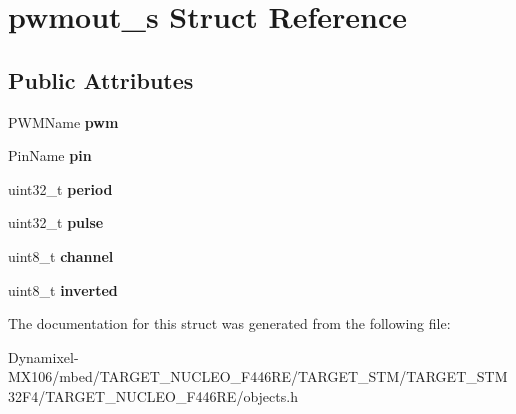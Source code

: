 \hypertarget{structpwmout__s}{}\section{pwmout\+\_\+s Struct Reference}
\label{structpwmout__s}
\subsection*{Public Attributes}
\begin{DoxyCompactItemize}
\item 
P\+W\+M\+Name {\bfseries pwm}\hypertarget{structpwmout__s_a0f9fcf14696c537528ba36b7f7c87983}{}\label{structpwmout__s_a0f9fcf14696c537528ba36b7f7c87983}

\item 
Pin\+Name {\bfseries pin}\hypertarget{structpwmout__s_a643a7952e0db81d57ce31cfd7e1867b3}{}\label{structpwmout__s_a643a7952e0db81d57ce31cfd7e1867b3}

\item 
uint32\+\_\+t {\bfseries period}\hypertarget{structpwmout__s_ab2160f7fe7387aa18b4fedd8ab1967ff}{}\label{structpwmout__s_ab2160f7fe7387aa18b4fedd8ab1967ff}

\item 
uint32\+\_\+t {\bfseries pulse}\hypertarget{structpwmout__s_ab2ad46b43d0fef8da1b915aee3037155}{}\label{structpwmout__s_ab2ad46b43d0fef8da1b915aee3037155}

\item 
uint8\+\_\+t {\bfseries channel}\hypertarget{structpwmout__s_a6aaa404199416e48ca3d5957575d1e68}{}\label{structpwmout__s_a6aaa404199416e48ca3d5957575d1e68}

\item 
uint8\+\_\+t {\bfseries inverted}\hypertarget{structpwmout__s_a176a7ce3f3ff0a2c4ab4836f85b3e002}{}\label{structpwmout__s_a176a7ce3f3ff0a2c4ab4836f85b3e002}

\end{DoxyCompactItemize}


The documentation for this struct was generated from the following file\+:\begin{DoxyCompactItemize}
\item 
Dynamixel-\/\+M\+X106/mbed/\+T\+A\+R\+G\+E\+T\+\_\+\+N\+U\+C\+L\+E\+O\+\_\+\+F446\+R\+E/\+T\+A\+R\+G\+E\+T\+\_\+\+S\+T\+M/\+T\+A\+R\+G\+E\+T\+\_\+\+S\+T\+M32\+F4/\+T\+A\+R\+G\+E\+T\+\_\+\+N\+U\+C\+L\+E\+O\+\_\+\+F446\+R\+E/objects.\+h\end{DoxyCompactItemize}
